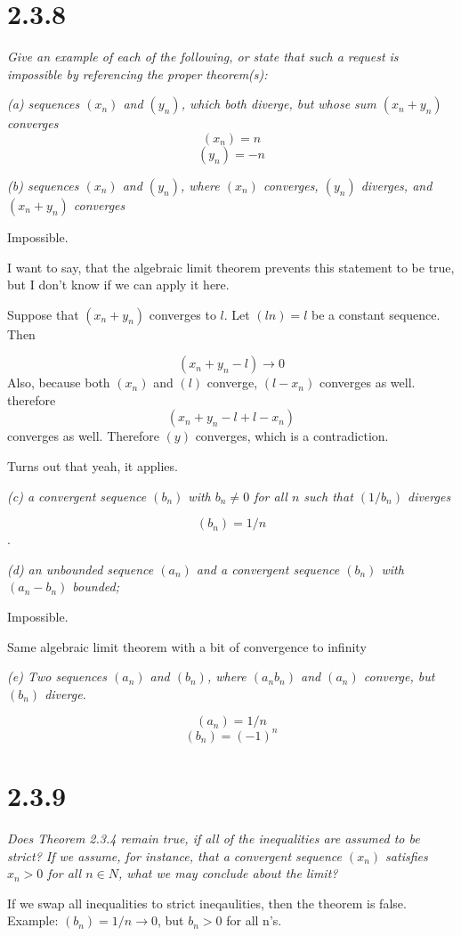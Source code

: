 \documentclass[11pt,oneside,titlepage]{book}
\begin{document}
\section*{2.3.8}
\textit{Give an example of each of the following, or state that such a
  request is impossible by referencing the proper theorem(s):}

\textit{(a) sequences $(x_n)$ and $(y_n)$, which both diverge, but
  whose sum $(x_n + y_n)$ converges}
$$(x_n) = n$$
$$(y_n) = -n$$

\textit{(b) sequences $(x_n)$ and $(y_n)$, where $(x_n)$ converges, $(y_n)$
  diverges, and $(x_n + y_n)$ converges}

Impossible.

I want to say, that the algebraic limit theorem prevents 
this statement to be true, but I don't know if we can apply it here.

Suppose that $(x_n + y_n)$ converges to $l$. Let $(ln) = l$ be a constant
sequence. Then

$$(x_n + y_n - l) \to 0$$
Also, because both $(x_n)$ and $(l)$ converge, $(l - x_n)$ converges as well.
therefore
$$(x_n + y_n - l+ l - x_n)$$ converges as well. Therefore $(y)$ converges,
which is a contradiction.

Turns out that yeah, it applies.

\textit{(c) a convergent sequence $(b_n)$ with $b_n \neq 0$ for all $n$ such
  that $(1/b_n)$ diverges}

$$(b_n) = 1/n$$.

\textit{(d) an unbounded sequence $(a_n)$ and a convergent sequence $(b_n)$
  with $(a_n - b_n)$ bounded;}

Impossible.

Same algebraic limit theorem with a bit of convergence to infinity

\textit{(e) Two sequences $(a_n)$ and $(b_n)$, where $(a_n b_n)$ and
  $(a_n)$ converge, but $(b_n)$ diverge.}

$$(a_n) = 1/n$$
$$(b_n) = (-1)^n$$

\section*{2.3.9}
\textit{Does Theorem 2.3.4 remain true, if all of the inequalities are
  assumed to be strict? If we assume, for instance, that a convergent
  sequence $(x_n)$ satisfies $x_n > 0$ for all $n \in N$, what we may conclude
  about the limit?}

If we swap all inequalities to strict ineqaulities, then the theorem is false.
Example: $(b_n) = 1/n \to 0$, but $b_n > 0$ for all n's.
\end{document}
